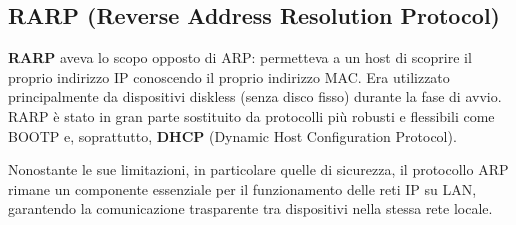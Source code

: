 \subsection{RARP (Reverse Address Resolution Protocol)}
\textbf{RARP} aveva lo scopo opposto di ARP: permetteva a un host di scoprire il proprio indirizzo IP conoscendo il proprio indirizzo MAC. Era utilizzato principalmente da dispositivi diskless (senza disco fisso) durante la fase di avvio. RARP è stato in gran parte sostituito da protocolli più robusti e flessibili come BOOTP e, soprattutto, \textbf{DHCP} (Dynamic Host Configuration Protocol).

\vspace{0.5cm}
\noindent Nonostante le sue limitazioni, in particolare quelle di sicurezza, il protocollo ARP rimane un componente essenziale per il funzionamento delle reti IP su LAN, garantendo la comunicazione trasparente tra dispositivi nella stessa rete locale.


